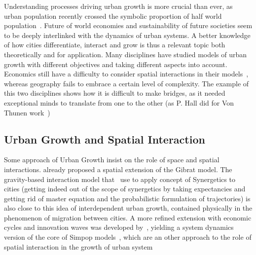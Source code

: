 \documentclass[Royal,sageh,times]{sagej}
\begin{document}
Understanding processes driving urban growth is more crucial than ever, as urban population recently crossed the symbolic proportion of half world population~\cite{}.%
 Future of world economies and sustainability of future societies seem to be deeply interlinked with the dynamics of urban systems.%
 A better knowledge of how cities differentiate, interact and grow is thus a relevant topic both theoretically and for application. Many disciplines have studied models of urban growth with different objectives and taking different aspects into account. Economics still have a difficulty to consider spatial interactions in their models~\cite{krugman1998space}, whereas geography fails to embrace a certain level of complexity. The example of this two disciplines shows how it is difficult to make bridges, as it needed exceptional minds to translate from one to the other (as P. Hall did for Von Thunen work~\cite{taylor2016polymath}) %





\subsection*{Urban Growth and Spatial Interaction}


Some approach of Urban Growth insist on the role of space and spatial interactions. \cite{bretagnolle2000long} already proposed a spatial extension of the Gibrat model. The gravity-based interaction model that~\cite{sanders1992systeme} use to apply concept of Synergetics to cities (getting indeed out of the scope of synergetics by taking expectancies and getting rid of master equation and the probabilistic formulation of trajectories) is also close to this idea of interdependent urban growth, contained physically in the phenomenon of migration between cities. A more refined extension with economic cycles and innovation waves was developed by~\cite{favaro2011gibrat}, yielding a system dynamics version of the core of Simpop models~\cite{pumain2012multi}, which are an other approach to the role of spatial interaction in the growth of urban system
\end{document}
